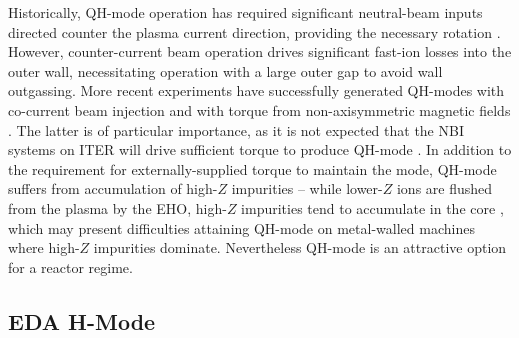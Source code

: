 Historically, QH-mode operation has required significant neutral-beam inputs directed counter the plasma current direction, providing the necessary rotation \cite{Burrell2002}.  However, counter-current beam operation drives significant fast-ion losses into the outer wall, necessitating operation with a large outer gap to avoid wall outgassing.  More recent experiments have successfully generated QH-modes with co-current beam injection \cite{Burrell2009} and with torque from non-axisymmetric magnetic fields \cite{Garofalo2011,Burrell2013}.  The latter is of particular importance, as it is not expected that the NBI systems on ITER will drive sufficient torque to produce QH-mode \cite{Garofalo2011}.  In addition to the requirement for externally-supplied torque to maintain the mode, QH-mode suffers from accumulation of high-$Z$ impurities -- while lower-$Z$ ions are flushed from the plasma by the EHO, high-$Z$ impurities tend to accumulate in the core \cite{Doyle2001,Suttrop2005}, which may present 
difficulties attaining QH-mode on metal-walled machines where high-$Z$ impurities dominate.  Nevertheless QH-mode is an attractive option for a reactor regime.

\subsection{EDA H-Mode}\label{subsec:hcr_eda}

